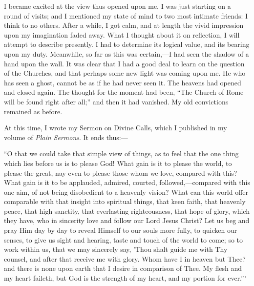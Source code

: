 I became excited at the view thus opened upon me. I was just starting
on a round of visits; and I mentioned my state of mind to two most
intimate friends: I think to no others. After a while, I got calm, and
at length the vivid impression upon my imagination faded away. What I
thought about it on reflection, I will attempt to describe presently. I
had to determine its logical value, and its bearing upon my duty.
Meanwhile, so far as this was certain,—I had seen the shadow of a hand
upon the wall. It was clear that I had a good deal to learn on the
question of the Churches, and that perhaps some new light was coming
upon me. He who has seen a ghost, cannot be as if he had never seen it.
The heavens had opened and closed again. The thought for the moment had
been, ``The Church of Rome will be found right after all;'' and then it had vanished. My old convictions remained as before.

At this time, I wrote my Sermon on Divine Calls, which I published in
my volume of \emph{Plain Sermons}. It ends thus:—

``O that we could take that simple view of things, as to feel
that the one thing which lies before us is to please God! What gain is
it to please the world, to please the great, nay even to please those
whom we love, compared with this? What gain is it to be applauded,
admired, courted, followed,—compared with this one aim, of not being
disobedient to a heavenly vision? What can this world offer comparable
with that insight into spiritual things, that keen faith, that heavenly
peace, that high sanctity, that everlasting righteousness, that hope of
glory, which they have, who in sincerity love and follow our Lord Jesus
Christ? Let us beg and pray Him day by day to reveal Himself to our
souls more fully, to quicken our senses, to give us sight and hearing,
taste and touch of the world to come; so to work within us, that we may
sincerely say, 'Thou shalt guide me with Thy counsel, and after that
receive me with glory. Whom have I in heaven but Thee? and there is none
upon earth that I desire in comparison of Thee. My flesh and my heart
faileth, but God is the strength of my heart, and my portion for
ever.'''

